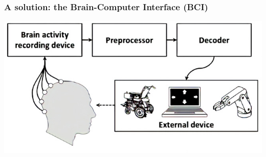 \documentclass{kul-ulille-beamer}
\begin{document}
\begin{frame}
  \frametitle{A solution: the Brain-Computer Interface (BCI)}
  \centering
  \includegraphics[width=.75\textwidth]{figures/intro/bci_loop.png}
\end{frame}


\end{document}
